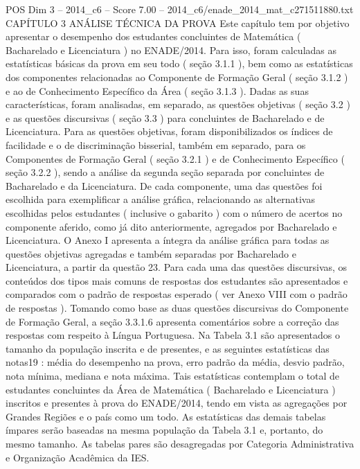 \begin{textsample}{POS Dim 3 – 2014\_c6 – Score 7.00 – 2014\_c6/enade\_2014\_mat\_c271511880.txt}  \label{ex:f3_pos_031}
CAPÍTULO 3 ANÁLISE TÉCNICA DA PROVA Este capítulo tem por objetivo apresentar o desempenho dos estudantes concluintes de Matemática ( Bacharelado e Licenciatura ) no ENADE/2014.
Para isso, foram calculadas as estatísticas básicas da prova em seu todo ( seção 3.1.1 ), bem como as estatísticas dos componentes relacionadas ao Componente de Formação Geral ( seção 3.1.2 ) e ao de Conhecimento Específico da Área ( seção 3.1.3 ).
Dadas as suas características, foram analisadas, em separado, as questões objetivas ( seção 3.2 ) e as questões discursivas ( seção 3.3 ) para concluintes de Bacharelado e de Licenciatura.
Para as questões objetivas, foram disponibilizados os índices de facilidade e o de discriminação bisserial, também em separado, para os Componentes de Formação Geral ( seção 3.2.1 ) e de Conhecimento Específico ( seção 3.2.2 ), sendo a análise da segunda seção separada por concluintes de Bacharelado e da Licenciatura.
De cada componente, uma das questões foi escolhida para exemplificar a análise gráfica, relacionando as alternativas escolhidas pelos estudantes ( inclusive o gabarito ) com o número de acertos no componente aferido, como já dito anteriormente, agregados por Bacharelado e Licenciatura.
O Anexo I apresenta a íntegra da análise gráfica para todas as questões objetivas agregadas e também separadas por Bacharelado e Licenciatura, a partir da questão 23.
Para cada uma das questões discursivas, os conteúdos dos tipos mais comuns de respostas dos estudantes são apresentados e comparados com o padrão de respostas esperado ( ver Anexo VIII com o padrão de respostas ).
Tomando como base as duas questões discursivas do Componente de Formação Geral, a seção 3.3.1.6 apresenta comentários sobre a correção das respostas com respeito à Língua Portuguesa.
Na Tabela 3.1 são apresentados o tamanho da população inscrita e de presentes, e as seguintes estatísticas das notas19 : média do desempenho na prova, erro padrão da média, desvio padrão, nota mínima, mediana e nota máxima.
Tais estatísticas contemplam o total de estudantes concluintes da Área de Matemática ( Bacharelado e Licenciatura ) inscritos e presentes à prova do ENADE/2014, tendo em vista as agregações por Grandes Regiões e o país como um todo.
As estatísticas das demais tabelas ímpares serão baseadas na mesma população da Tabela 3.1 e, portanto, do mesmo tamanho.
As tabelas pares são desagregadas por Categoria Administrativa e Organização Acadêmica da IES.

\end{textsample}
